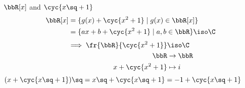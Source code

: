 \begin{example}
  \( \bbR[x] \) and \( \cyc{x\sq+1} \)
  \begin{align*}
    \bbR[x] &= \{ g(x) + \cyc{x^2+1} \mid g(x)\in \bbR[x] \} \\
          &= \{ ax+b + \cyc{x^2+1} \mid a,b\in \bbR \} \iso \C
  \end{align*}
  \begin{align*}
    \implies \fr{\bbR}{\cyc{x^2+1}}&\iso\C \\
    \bbR &\to \bbR \\
    x+\cyc{x^2+1} &\mapsto i
  \end{align*}
  \( (x+\cyc{x\sq +1})\sq = x\sq + \cyc{x\sq+1} = -1+\cyc{x\sq+1} \)
\end{example}